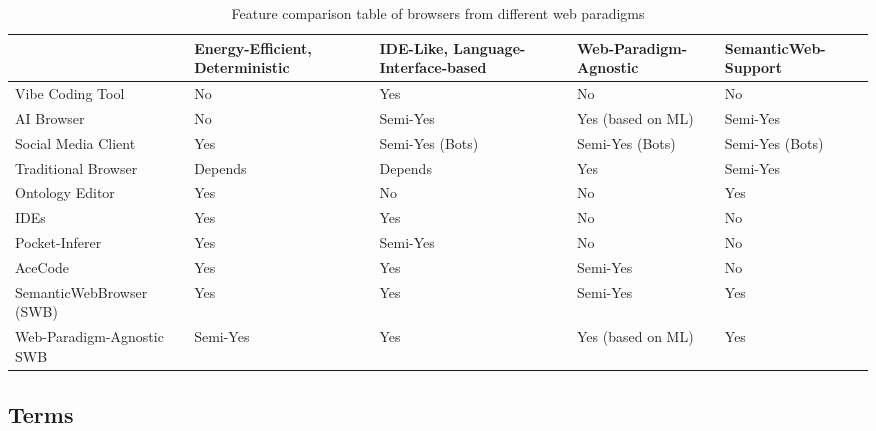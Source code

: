\documentclass[12pt,a4paper]{article}
\begin{document}
\begin{table}[h]
    \centering
    \begin{tabular}{|l|p{2.5cm}|p{2.5cm}|p{2.5cm}|p{2.5cm}|}
    \hline
     & Energy-Efficient, Deterministic & IDE-Like, Language-Interface-based & Web-Paradigm-Agnostic & SemanticWeb-Support \\
     \hline
    Vibe Coding Tool & \cellcolor{red!25} No & \cellcolor{green} Yes & \cellcolor{red!25} No & \cellcolor{red!25} No \\
     \hline
    AI Browser & \cellcolor{red!25} No & \cellcolor{yellow} Semi-Yes & \cellcolor{green} Yes (based on ML) & \cellcolor{yellow} Semi-Yes \\
    \hline
    Social Media Client & \cellcolor{green} Yes & \cellcolor{yellow} Semi-Yes (Bots) & \cellcolor{yellow} Semi-Yes (Bots) & \cellcolor{yellow} Semi-Yes (Bots) \\
    \hline
    Traditional Browser & \cellcolor{gray!25} Depends & \cellcolor{gray!25} Depends & \cellcolor{green} Yes & \cellcolor{yellow} Semi-Yes \\
    \hline
    Ontology Editor & \cellcolor{green} Yes & \cellcolor{red!25} No & \cellcolor{red!25} No & \cellcolor{green} Yes \\
    \hline
    IDEs & \cellcolor{green} Yes & \cellcolor{green} Yes & \cellcolor{red!25} No & \cellcolor{red!25} No \\
    \hline
    Pocket-Inferer & \cellcolor{green} Yes & \cellcolor{yellow} Semi-Yes & \cellcolor{red!25} No & \cellcolor{red!25} No \\
    \hline
    AceCode & \cellcolor{green} Yes & \cellcolor{green} Yes & \cellcolor{yellow} Semi-Yes & \cellcolor{red!25} No \\
    \hline
    SemanticWebBrowser (SWB) & \cellcolor{green} Yes & \cellcolor{green} Yes & \cellcolor{yellow}Semi-Yes & \cellcolor{green}Yes \\
    \hline
    Web-Paradigm-Agnostic SWB & \cellcolor{yellow} Semi-Yes & \cellcolor{green}Yes & \cellcolor{green}Yes (based on ML) & \cellcolor{green}Yes \\
    \hline
    \end{tabular}
    \caption{Feature comparison table of browsers from different web paradigms}
    \label{tab:features}
\end{table}

\subsection{Terms}
\end{document}
